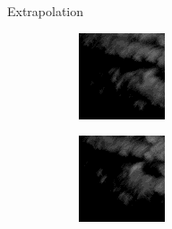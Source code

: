 \documentclass{beamer}
\begin{document}
\begin{frame}{Extrapolation}
	\begin{figure}
	    \begin{subfigure}{.3\textwidth}
	        \centering
	        \begin{mdframed}[style=blue,nobreak=true,align=center]
	        \includegraphics[width=\linewidth]{fig/extra/0.png}
	        \end{mdframed}
	    \end{subfigure}
	    \begin{subfigure}{.3\textwidth}
	        \centering
	        \begin{mdframed}[style=blue,nobreak=true,align=center]
	        \includegraphics[width=\linewidth]{fig/extra/1.png}

\end{mdframed}
\end{subfigure}
\end{figure}
\end{frame}
\end{document}
